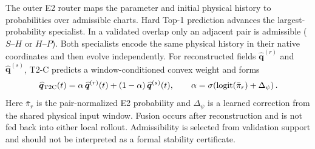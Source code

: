 The outer E2 router maps the parameter and initial physical history to probabilities over admissible charts. Hard Top-1 prediction advances the largest-probability specialist. In a validated overlap only an adjacent pair is admissible ($S$--$H$ or $H$--$P$). Both specialists encode the same physical history in their native coordinates and then evolve independently. For reconstructed fields $\widehat{\bm q}^{(r)}$ and $\widehat{\bm q}^{(s)}$, T2-C predicts a window-conditioned convex weight and forms
\begin{equation}
  \widehat{\bm q}_{\rm T2C}(t)
  =\alpha\,\widehat{\bm q}^{(r)}(t)+(1-\alpha)\,\widehat{\bm q}^{(s)}(t),
  \qquad \alpha=\sigma\!\left(\operatorname{logit}(\bar\pi_r)+\Delta_\psi\right).
  \label{eq:main_t2c}
\end{equation}
Here $\bar\pi_r$ is the pair-normalized E2 probability and $\Delta_\psi$ is a learned correction from the shared physical input window. Fusion occurs after reconstruction and is not fed back into either local rollout. Admissibility is selected from validation support and should not be interpreted as a formal stability certificate.
